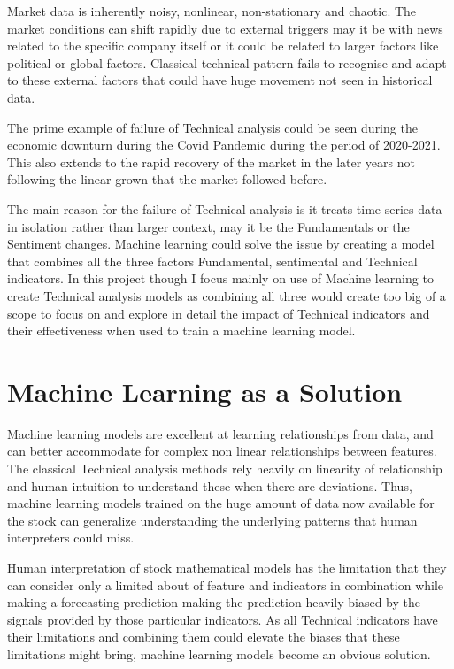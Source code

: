 Market data is inherently noisy, nonlinear, non-stationary and chaotic. The market conditions can shift rapidly due to external triggers may it be with news related to the specific company itself or it could be related to larger factors like political or global factors. Classical technical pattern fails to recognise and adapt to these external factors that could have huge movement not seen in historical data.

The prime example of failure of Technical analysis could be seen during the economic downturn during the Covid Pandemic during the period of 2020-2021. This also extends to the rapid recovery of the market in the later years not following the linear grown that the market followed before. 

The main reason for the failure of Technical analysis is it treats time series data in isolation rather than larger context, may it be the Fundamentals or the Sentiment changes. Machine learning could solve the issue by creating a model that combines all the three factors Fundamental, sentimental and Technical indicators. In this project though I focus mainly on use of Machine learning to create Technical analysis models as combining all three would create too big of a scope to focus on and explore in detail the impact of Technical indicators and their effectiveness when used to train a machine learning model.
 
\section{Machine Learning as a Solution}

Machine learning models are excellent at learning relationships from data, and can better accommodate for complex non linear relationships between features. The classical Technical analysis methods rely heavily on linearity of relationship and human intuition to understand these when there are deviations. Thus, machine learning models trained on the huge amount of data now available for the stock can generalize understanding the underlying patterns that human interpreters could miss.

Human interpretation of stock mathematical models has the limitation that they can consider only a limited about of feature and indicators in combination while making a forecasting prediction making the prediction heavily biased by the signals provided by those particular indicators. As all Technical indicators have their limitations and combining them could elevate the biases that these limitations might bring, machine learning models become an obvious solution. 


